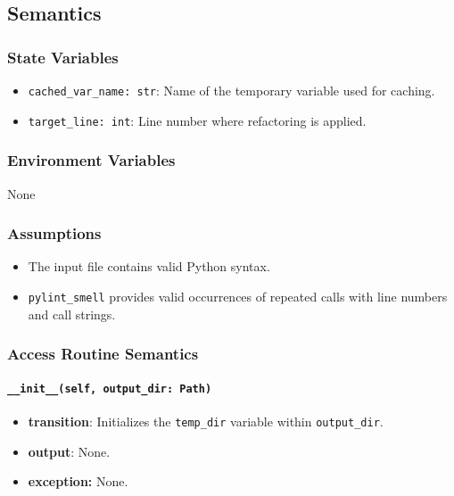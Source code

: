 \documentclass[12pt, titlepage]{article}
\begin{document}
\subsection{Semantics}

\subsubsection{State Variables}
\begin{itemize}
  \item \texttt{cached\_var\_name: str}: Name of the temporary variable used for caching.
  \item \texttt{target\_line: int}: Line number where refactoring is applied.
\end{itemize}

\subsubsection{Environment Variables}
None

\subsubsection{Assumptions}
\begin{itemize}
  \item The input file contains valid Python syntax.
  \item \texttt{pylint\_smell} provides valid occurrences of repeated calls with line numbers and call strings.
\end{itemize}

\subsubsection{Access Routine Semantics}

\paragraph{\texttt{\_\_init\_\_(self, output\_dir: Path)}}
\begin{itemize}
  \item \textbf{transition}: Initializes the \texttt{temp\_dir} variable within \texttt{output\_dir}.
  \item \textbf{output}: None.
  \item \textbf{exception:} None.
\end{itemize}
\end{document}
